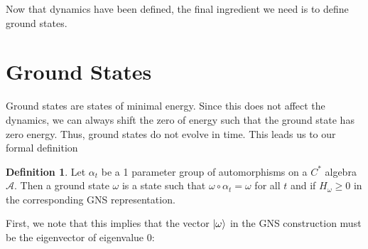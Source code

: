 \documentclass[prb,11pt, nofootinbib]{revtex4-2}
\theoremstyle{definition}
\theoremstyle{definition}
\theoremstyle{definition}
\theoremstyle{definition}
\newtheorem{Definition}[Theorem]{Definition}
\newcommand{\note}[1]{{\color{red} {#1}}}
\renewcommand{\note}[1]{{}}
\begin{document}
\note{Theorem: There exists a one parameter group of automorphisms $\alpha_t$ on the quasi-local algebra $\mathcal{A}$ that extends the automorphism $\exp(t\delta)$ defined on the local algebra.

	Proof: We will extend the group as follows. \note{Write this part in bullet points }First, we will begin with an interaction on a finite region. This will allow us to show isometry, which will then provide an extension to the quasi local algebra using well known results. Finally, we will extend the domain of $t$ from a neighbourhood of the origin to the entire real line.

	We begin by defining $\delta_{\Lambda}(A)  = i[H_{\Lambda}, A]$ for a finite subset $\Lambda$ of the sites. We also begin with a local operator $A\in \mathcal{A}(X)$. For each $\Lambda\supseteq X$, the derivations $\delta^n(A)$ and $\delta_{\Lambda}^n(A)$ will agree for $n\le N(\Lambda)$, where $N(\Lambda)$ is some function depending on $\Lambda$\note{~Probably draw here a picture about how the correlations spread}. Thus, we have
	\[
		\|\alpha_t^\Lambda(A) - \alpha_t(A)\|= \left\|\sum_{n=N(\Lambda)}^\infty \left( \frac{t^n\delta_{\Lambda}^n(A)}{n!} - \frac{t^n \delta^n(A)}{n!} \right) \right\|
	.\] 
Note that $N(\Lambda)\xrightarrow{\Lambda\to\infty}\infty$.}
Now that dynamics have been defined, the final ingredient we need is to define ground states. 
\section{Ground States}
Ground states are states of minimal energy. Since this does not affect the dynamics, we can always shift the zero of energy such that the ground state has zero energy\note{~Probably write down the derivation and show that the thing commutes}. Thus, ground states do not evolve in time\note{~Write down the $\exp(-iHt)$ expression here}. This leads us to our formal definition
\begin{Definition}
	Let $\alpha_t$ be a 1 parameter group of automorphisms on a $C^*$ algebra $\mathcal{A}$. Then a ground state $\omega$ is a state such that $\omega\circ \alpha_t=\omega$ for all $t$ and if $H_\omega\ge 0$ in the corresponding GNS representation\note{~The important point here is that even though the derivation $\delta$ exists on $\Lambda\to\infty$, $H$ does not, because it is unbounded; hence, we can only verify positivity in the GNS representation}.
\end{Definition}
First, we note that this implies that the vector $\ket{\omega}$ in the GNS construction must be the eigenvector of eigenvalue 0:
\end{document}
